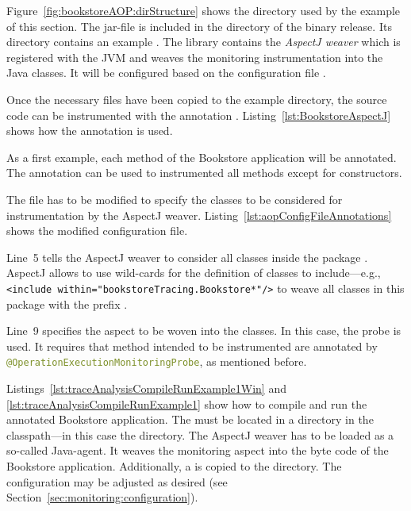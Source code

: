 Figure~\ref{fig:bookstoreAOP:dirStructure} shows the directory used by the example of this section. The jar-file  is included in the  directory of the \Kieker{} binary release. Its  directory contains an example \file{\aopConfigFile}. The library  contains the \textit{AspectJ weaver} which is registered with the JVM and weaves the monitoring instrumentation into the Java classes. It will be configured based on the configuration file \file{\file{\aopConfigFile}}.

Once the necessary files have been copied to the example directory, the source code can be instrumented with the annotation 
. Listing~\ref{lst:BookstoreAspectJ} shows how the annotation is used.

\setJavaCodeListing


\noindent As a first example, each method of the Bookstore application will be annotated. The annotation can be used to instrumented all methods except for constructors. 

The \file{\aopConfigFile} file has to be modified to specify the classes to be considered for instrumentation by the AspectJ weaver. Listing~\ref{lst:aopConfigFileAnnotations} shows the modified configuration file.

\setXMLListing


\noindent Line~5 tells the AspectJ weaver to consider all classes inside the package %
. AspectJ allows to use wild-cards for the definition of classes to %
include---e.g., \lstinline$<include within="bookstoreTracing.Bookstore*"/>$ to weave all %
classes in this package with the prefix . 

Line~9 specifies the aspect to be woven into the classes. In this case, the \Kieker{} %
probe  is used. It requires that %
method intended to be instrumented are annotated by %
\lstinline[language=Java]{@OperationExecutionMonitoringProbe}, as mentioned before. 

Listings~\ref{lst:traceAnalysisCompileRunExample1Win} and %
\ref{lst:traceAnalysisCompileRunExample1} show how to compile and run the annotated %
Bookstore application. The \file{\aopConfigFile} must be located in a %
 directory in the classpath---in this case the  directory. %
The AspectJ weaver has to be loaded as a so-called Java-agent. It weaves the %
monitoring aspect into the byte code of the Bookstore application. %
Additionally, a \file{\kiekerMonitoringProperties{}} is copied to the  directory. %
The configuration may be adjusted as desired (see Section~\ref{sec:monitoring:configuration}).

